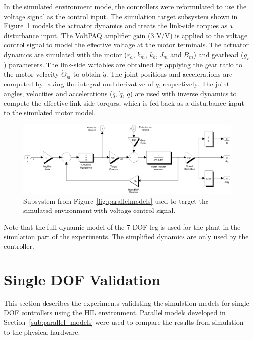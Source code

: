 In the simulated environment mode, the controllers were reformulated to use the voltage signal as the control input. The simulation target subsystem shown in Figure~\ref{fig:simmodel} models the actuator dynamics and treats the link-side torques as a disturbance input. The VoltPAQ amplifier gain ($3$ V/V) is applied to the voltage control signal to model the effective voltage at the motor terminals. The actuator dynamics are simulated with the motor ($r_a$, $k_m$, $k_b$, $J_m$ and $B_m$) and gearhead ($g_r$) parameters. The link-side variables are obtained by applying the gear ratio to the motor velocity $\dot{\Theta}_m$ to obtain $\dot{q}$. The joint positions and accelerations are computed by taking the integral and derivative of $\dot{q}$, respectively. The joint angles, velocities and accelerations ($q$, $\dot{q}$, $\dot{\dot{q}}$) are used with inverse dynamics to compute the effective link-side torques, which is fed back as a disturbance input to the simulated motor model. 

\begin{figure}[!b]
	\centering
    \includegraphics[scale=0.5]{fig/experiments/simmodel.eps} 
  	\caption{Subsystem from Figure~\ref{fig:parallelmodels} used to target the simulated environment with voltage control signal.}
	\label{fig:simmodel}
\end{figure}

Note that the full dynamic model of the 7 DOF leg is used for the plant in the simulation part of the experiments. The simplified dynamics are only used by the controller. 



\section{Single DOF Validation} %
\label{sec:1dof_validation}
This section describes the experiments validating the simulation models for single DOF controllers using the HIL environment. Parallel models developed in Section~\ref{sub:parallel_models} were used to compare the results from simulation to the physical hardware. 

